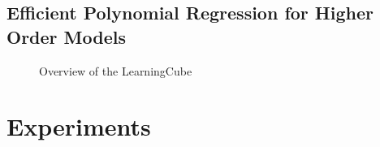 \documentclass[letterpaper, 10 pt, conference]{ieeeconf}  %
\begin{document}
\subsection{Efficient Polynomial Regression for Higher Order Models}
\begin{figure}[thpb]
      \centering
        \caption{Overview of the LearningCube}
        \label{fig:cube}
\end{figure}

\section{Experiments}
\end{document}
